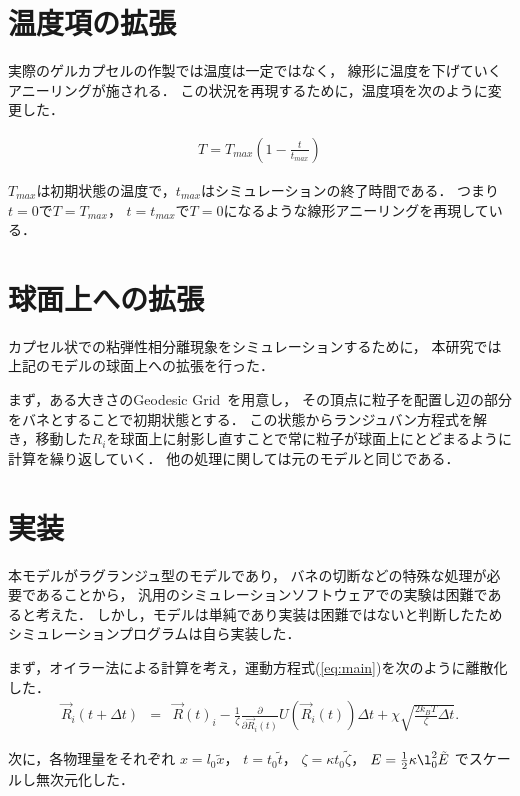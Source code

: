 \section{温度項の拡張}
実際のゲルカプセルの作製では温度は一定ではなく，
線形に温度を下げていくアニーリングが施される．
この状況を再現するために，温度項を次のように変更した．

\begin{eqnarray}
T = T_{max}(1-\frac{t}{t_{max}})
\end{eqnarray}

$T_{max}$は初期状態の温度で，$t_{max}$はシミュレーションの終了時間である．
つまり$t=0$で$T=T_{max}$，
$t=t_{max}$で$T=0$になるような線形アニーリングを再現している．


\section{球面上への拡張}
カプセル状での粘弾性相分離現象をシミュレーションするために，
本研究では上記のモデルの球面上への拡張を行った．

まず，ある大きさのGeodesic Grid~\cite{Geodesic}を用意し，
その頂点に粒子を配置し辺の部分をバネとすることで初期状態とする．
この状態からランジュバン方程式を解き，移動した$R_i$を球面上に射影し直すことで常に粒子が球面上にとどまるように計算を繰り返していく．
他の処理に関しては元のモデルと同じである．




\section{実装}
本モデルがラグランジュ型のモデルであり，
バネの切断などの特殊な処理が必要であることから，
汎用のシミュレーションソフトウェアでの実験は困難であると考えた．
しかし，モデルは単純であり実装は困難ではないと判断したためシミュレーションプログラムは自ら実装した．

まず，オイラー法による計算を考え，運動方程式(\ref{eq:main})を次のように離散化した．
\begin{eqnarray}
    \vec{R}_i(t+\Delta t) &=& 
    \vec{R}(t)_i
    -\frac{1}{\zeta}\frac{\partial}{\partial\vec{R}_i(t)}U(\vec{R}_i(t))\Delta t
    +\chi\sqrt{\frac{2k_B T}{\zeta}\Delta t}
    .
\end{eqnarray}

次に，各物理量をそれぞれ
$x=l_0 \tilde{x}$，
$t=t_0 \tilde{t}$，
$\zeta=\kappa t_0 \tilde{\zeta}$，
$E=\frac{1}{2}\kappa\l_0^2\tilde{E}$
でスケールし無次元化した．



